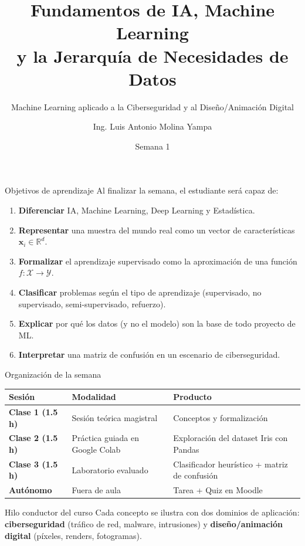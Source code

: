 \documentclass[10pt,aspectratio=169]{beamer}
\title[INT210 · Semana 1]{Fundamentos de IA, Machine Learning\\y la Jerarquía de Necesidades de Datos}
\subtitle{Machine Learning aplicado a la Ciberseguridad y al Diseño/Animación Digital}
\author[L. A. Molina Yampa]{Ing. Luis Antonio Molina Yampa}
\institute[USFX]{Universidad Mayor, Real y Pontificia de San Francisco Xavier de Chuquisaca\\
  INT210 -- Machine Learning}
\date{Semana 1}
\begin{document}
\begin{frame}[plain]
  \titlepage
\end{frame}

\begin{frame}{Objetivos de aprendizaje}
  Al finalizar la semana, el estudiante será capaz de:
  \medskip
  \begin{enumerate}
    \item \textbf{Diferenciar} IA, Machine Learning, Deep Learning y Estadística.
    \item \textbf{Representar} una muestra del mundo real como un vector de características $\mathbf{x}_i\in\mathbb{R}^d$.
    \item \textbf{Formalizar} el aprendizaje supervisado como la aproximación de una función $f:\mathcal{X}\to\mathcal{Y}$.
    \item \textbf{Clasificar} problemas según el tipo de aprendizaje (supervisado, no supervisado, semi-supervisado, refuerzo).
    \item \textbf{Explicar} por qué los datos (y no el modelo) son la base de todo proyecto de ML.
    \item \textbf{Interpretar} una matriz de confusión en un escenario de ciberseguridad.
  \end{enumerate}
\end{frame}

\begin{frame}{Organización de la semana}
  \centering
  \begin{tabular}{>{\bfseries}l l l}
    \toprule
    Sesión & Modalidad & Producto \\
    \midrule
    Clase 1 (1.5 h) & Sesión teórica magistral & Conceptos y formalización \\
    Clase 2 (1.5 h) & Práctica guiada en Google Colab & Exploración del dataset Iris con Pandas \\
    Clase 3 (1.5 h) & Laboratorio evaluado & Clasificador heurístico + matriz de confusión \\
    Autónomo & Fuera de aula & Tarea + Quiz en Moodle \\
    \bottomrule
  \end{tabular}
  \vfill
  \begin{block}{Hilo conductor del curso}
    Cada concepto se ilustra con dos dominios de aplicación:
    \textbf{ciberseguridad} (tráfico de red, malware, intrusiones) y
    \textbf{diseño/animación digital} (píxeles, renders, fotogramas).
  \end{block}
\end{frame}
\end{document}
